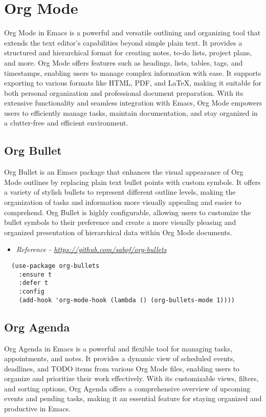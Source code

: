 \documentclass[11pt]{article}
\begin{document}
\section{Org Mode}
\label{sec:orgaa42f0c}
Org Mode in Emacs is a powerful and versatile outlining and organizing tool that extends the text editor's capabilities beyond simple plain text. It provides a structured and hierarchical format for creating notes, to-do lists, project plans, and more. Org Mode offers features such as headings, lists, tables, tags, and timestamps, enabling users to manage complex information with ease. It supports exporting to various formats like HTML, PDF, and \LaTeX{}, making it suitable for both personal organization and professional document preparation. With its extensive functionality and seamless integration with Emacs, Org Mode empowers users to efficiently manage tasks, maintain documentation, and stay organized in a clutter-free and efficient environment.
\subsection{Org Bullet}
\label{sec:orga671186}
Org Bullet is an Emacs package that enhances the visual appearance of Org Mode outlines by replacing plain text bullet points with custom symbols. It offers a variety of stylish bullets to represent different outline levels, making the organization of tasks and information more visually appealing and easier to comprehend. Org Bullet is highly configurable, allowing users to customize the bullet symbols to their preference and create a more visually pleasing and organized presentation of hierarchical data within Org Mode documents.

\begin{itemize}
\item \emph{Reference - \url{https://github.com/sabof/org-bullets}}
\end{itemize}

\begin{verbatim}
  (use-package org-bullets
    :ensure t
    :defer t
    :config
    (add-hook 'org-mode-hook (lambda () (org-bullets-mode 1))))
\end{verbatim}
\subsection{Org Agenda}
\label{sec:org11f7547}
Org Agenda in Emacs is a powerful and flexible tool for managing tasks, appointments, and notes. It provides a dynamic view of scheduled events, deadlines, and TODO items from various Org Mode files, enabling users to organize and prioritize their work effectively. With its customizable views, filters, and sorting options, Org Agenda offers a comprehensive overview of upcoming events and pending tasks, making it an essential feature for staying organized and productive in Emacs.
\end{document}

